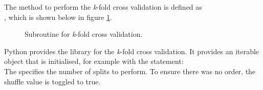 The method to perform the \textit{k}-fold cross validation is defined as\\ , which is shown below in figure \ref{fig:cvp}.
\begin{figure}[H]
	\centering
	\caption{Subroutine for \textit{k}-fold cross validation.}
	\label{fig:cvp}
\end{figure}
Python provides the  library for the \textit{k}-fold cross validation. It provides an iterable object that is initialised, for example with the statement:\\ 
The  specifies the number of splits to perform. To ensure there was no order, the shuffle value is toggled to true.

